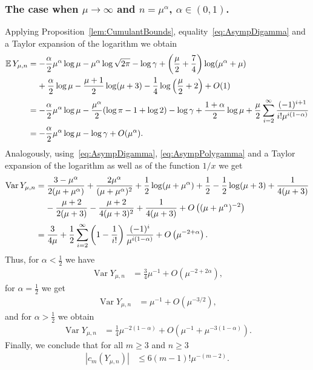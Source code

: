 \documentclass[AHL,Unicode,longabstracts,published]{cedram}
\newcommand{\EE}{\mathbb{E}\,}
\newcommand{\Var}{\mathop{\mathrm{Var}}\nolimits}
\begin{document}
\subsubsection{The case when $\mu\rightarrow \infty$ and $n =\mu^{\alpha}$, $\alpha \in (0,1)$.}
Applying Proposition~\ref{lem:CumulantBounds}, equality~\eqref{eq:AsympDigamma} and a Taylor expansion of the logarithm we obtain
\begin{align*}
\EE Y_{\mu,n}&=-\frac{\alpha}{2}\mu^{\alpha}\log \mu-\mu^{\alpha}\log\sqrt{2\pi}-\log\gamma +\left(\frac{\mu}{2}+\frac{7}{4}\right)\log(\mu^{\alpha}+\mu)\\
&\mkern20mu+\frac{\alpha}{2}\log\mu-\frac{\mu+1}{2}\log(\mu+3)-\frac{1}{4}\log\left(\frac{\mu}{2}+2\right)+O(1)\\[0.20em]
&= -\frac{\alpha}{2}\mu^{\alpha}\log \mu-\frac{\mu^{\alpha}}{2}(\log\pi-1+\log 2)-\log\gamma +\frac{1+\alpha}{2}\log\mu+\frac{\mu}{2}\sum\limits_{i=2}^{\infty}\frac{(-1)^{i+1}}{i!\mu^{i(1-\alpha)}}\\
&=-\frac{\alpha}{2}\mu^{\alpha}\log \mu-\log\gamma+O(\mu^{\alpha}).
\end{align*}
Analogously, using~\eqref{eq:AsympDigamma}, \eqref{eq:AsympPolygamma} and a Taylor expansion of the logarithm as well as of the function $1/x$ we get
\begin{align*}
\Var Y_{\mu,n}&=\frac{3-\mu^{\alpha}}{2(\mu+\mu^\alpha)}+\frac{2\mu^{\alpha}}{(\mu+\mu^\alpha)^2}+\frac{1}{2}\log(\mu+\mu^\alpha)+\frac{1}{2}-\frac{1}{2}\log(\mu+3)+\frac{1}{4(\mu+3)}\\
&\mkern20mu-\frac{\mu+2}{2(\mu+3)}-\frac{\mu+2}{4(\mu+3)^2}+\frac{1}{4(\mu+3)}+O\left((\mu+ \mu^{\alpha})^{-2}\right)\\[0.20em]
&=\frac{3}{4\mu}+\frac{1}{2}\sum\limits_{i=2}^{\infty}\left(1-\frac{1}{i!}\right)\frac{(-1)^i}{\mu^{i(1-\alpha)}}+ O\left(\mu^{-2+\alpha}\right).
\end{align*}
Thus, for $\alpha<\frac{1}{2}$ we have
\begin{align*}
\Var Y_{\mu,n}&=\frac{3}{4}\mu^{-1}+ O\left(\mu^{-2+2\alpha}\right),
\end{align*}
for $\alpha=\frac{1}{2}$ we get
\begin{align*}
\Var Y_{\mu,n}&=\mu^{-1}+ O\left(\mu^{-3/2}\right),
\end{align*}
and for $\alpha>\frac{1}{2}$ we obtain
\begin{align*}
\Var Y_{\mu,n}&=\frac{1}{4}\mu^{-2(1-\alpha)}+ O\left(\mu^{-1}+\mu^{-3(1-\alpha)}\right).
\end{align*}
Finally, we conclude that for all $m\geq 3$ and $n\geq 3$
\begin{align*}
|c_m(Y_{\mu,n})|&\leq 6(m-1)!\mu^{-(m-2)}.
\end{align*}
\end{document}
